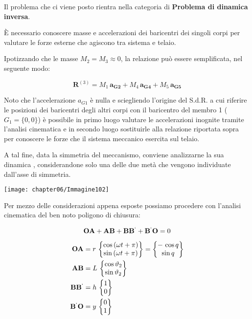 \begin{enumerate}
 		Il problema che ci viene posto rientra nella categoria di \textbf{Problema di dinamica inversa}.
 		
 		È necessario conoscere masse e accelerazioni dei baricentri dei singoli corpi per valutare le forze esterne che agiscono tra sistema e telaio.
 		
 		Ipotizzando che le masse $M_2 = M_3 \approx 0$, la relazione può essere semplificata, nel seguente modo:
 		
 		\[
 		\mathbf{R}^{(3)} = M_1\,\mathbf{a_{G2}} + M_4\,\mathbf{a_{G4}} + M_5\,\mathbf{a_{G5}}
 		\]
 		
 		Noto che l'accelerazione $a_{G1}$ è nulla e sciegliendo l'origine del S.d.R. a cui riferire le posizioni dei baricentri degli altri corpi con il baricentro del membro 1 ($G_1 = \{0,0\}$) è possibile in primo luogo valutare le accelerazioni inognite tramite l'analisi cinematica e in secondo luogo sostituirle alla relazione riportata sopra per conoscere le forze che il sistema meccanico esercita sul telaio.
 		
 		A tal fine, data la simmetria del meccanismo, conviene analizzarne la sua dinamica , considerandone solo una delle due metà che vengono individuate dall'asse di simmetria.
 		
 		\begin{minipage}{.3\textwidth}
 		\centering
 		\texttt{[image: chapter06/Immagine102]}
 		\end{minipage}
 		\hfill
 		\begin{minipage}{.65\textwidth}
 		Per mezzo delle considerazioni appena esposte possiamo procedere con l'analisi cinematica del ben noto poligono di chiusura:
 		
 		\[\mathbf{OA} + \mathbf{AB} + \mathbf{BB^{`}} + \mathbf{B^{`}O}=0\]
 		
 		\begin{align*}
 		\mathbf{OA} &= r\,\begin{Bmatrix}\cos{(\omega t + \pi)}\\\sin{(\omega t + \pi)}\end{Bmatrix} = \begin{Bmatrix}-\,\cos{q}\\\sin{q}\end{Bmatrix}\\
 		\mathbf{AB} &= L\,\begin{Bmatrix}\cos{\vartheta_2}\\\sin{\vartheta_2}\end{Bmatrix}\\
 		\mathbf{BB^{`}} &= h\,\begin{Bmatrix}1\\0\end{Bmatrix}\\
 		\mathbf{B^{`}O} &= y\,\begin{Bmatrix}0\\1\end{Bmatrix}
 		\end{align*}
 		\end{minipage}
 		

\end{enumerate}

